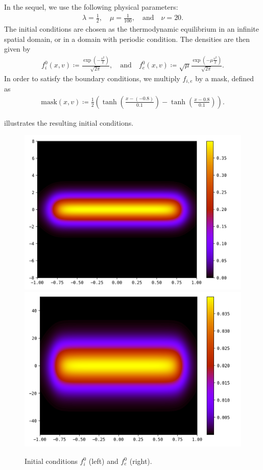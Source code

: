 \documentclass{article}
\numberwithin{equation}{section}
\newcommand{\imh}{\textheight} %
\begin{document}
In the sequel, we use the following physical parameters:
\begin{align}\label{eq:param_simu}
	\lambda = \frac{1}{2}, \quad \mu = \frac{1}{100}, \quad\text{and}\quad \nu = 20.
\end{align}
The initial conditions are chosen as the thermodynamic equilibrium in an infinite spatial domain, or in a domain with periodic condition. The densities are then given by
\begin{align*}
	f_{i}^0 (x,v) \coloneqq \frac{\exp\left(- \frac{v^2}{2}\right)}{\sqrt{2\pi}}, \quad \text{and} \quad f_{e}^0 (x,v) \coloneqq \sqrt{\mu}\frac{\exp\left(- \mu \frac{v^2}{2}\right)}{\sqrt{2\pi}}.
\end{align*}
In order to satisfy the boundary conditions, we multiply $f_{i,e}$ by a mask, defined as
\begin{align*}
	\text{mask}(x,v) \coloneqq \frac{1}{2} \left(\tanh\left(\frac{x - (-0.8)}{0.1}\right) - \tanh\left(\frac{x - 0.8}{0.1}\right)\right).
\end{align*}

 illustrates the resulting initial conditions.
\begin{figure}
	\centering
	\renewcommand{\imh}{0.33\linewidth}
	\includegraphics[height=\imh]{images/fi_init}
	\includegraphics[height=\imh]{images/fe_init}
	\caption{Initial conditions $f_i^0$ (left) and $f_e^0$ (right).}
	\label{fig:init_cond}
\end{figure}
\end{document}
